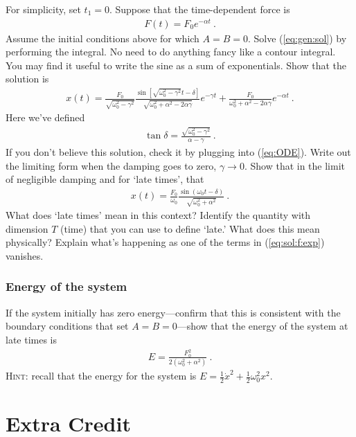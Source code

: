 \documentclass[12pt]{article}
\numberwithin{equation}{subsection}    %
\begin{document}
For simplicity, set $t_1 = 0$. Suppose that the time-dependent force is
\begin{align}
	F(t) = F_0 e^{-\alpha t} \ .
\end{align}
Assume the initial conditions above for which $A=B=0$. Solve (\ref{eq:gen:sol}) by performing the integral. No need to do anything fancy like a contour integral. You may find it useful to write the sine as a sum of exponentials. Show that the solution is
\begin{align}
	x(t) = \frac{F_0}{\sqrt{\omega_0^2 - \gamma^2}}
	\frac{\sin\left[ \sqrt{\omega_0^2 - \gamma^2} t - \delta \right]}{\sqrt{\omega_0^2 +\alpha^2 - 2\alpha \gamma}}
	e^{-\gamma t}
	+
	\frac{F_0}{\omega_0^2 + \alpha^2 - 2\alpha\gamma} e^{-\alpha t} \ .
	\label{eq:sol:f:exp}
\end{align}
Here we've defined
\begin{align}
	\tan \delta = \frac{\sqrt{\omega_0^2 - \gamma^2}}{\alpha - \gamma} \ .
\end{align}
If you don't believe this solution, check it by plugging into (\ref{eq:ODE}). Write out the limiting form when the damping goes to zero, $\gamma \to 0$. Show that in the limit of negligible damping and for `late times', that
\begin{align}
	x(t) = \frac{F_0}{\omega_0}\frac{\sin (\omega_0 t -\delta)}{\sqrt{\omega_0^2 + \alpha^2}} \ .
\end{align}
What does `late times' mean in this context? Identify the quantity with dimension $T$ (time) that you can use to define `late.' What does this mean physically? Explain what's happening as one of the terms in (\ref{eq:sol:f:exp}) vanishes.

\subsubsection{Energy of the system}

If the system initially has zero energy---confirm that this is consistent with the boundary conditions that set $A=B=0$---show that the energy of the system at late times is
\begin{align}
	E = \frac{F_0^2}{2(\omega_0^2 + \alpha^2)}\ .
\end{align}
\textsc{Hint}: recall that the energy for the system is $E = \frac 12 \dot x^2 + \frac 12 \omega_0^2 x^2$.





\section*{Extra Credit}
\end{document}
